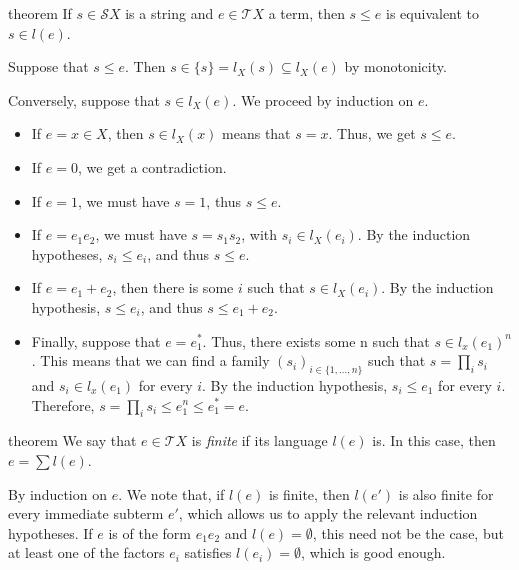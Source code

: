 \documentclass[11pt,a4paper]{amsart}
\theoremstyle{definition}
\begin{document}
\begin{theoremEnd}{theorem}
  \label{thm:membership-characterization}
  If $s \in \mathcal{S}X$ is a string and $e \in \mathcal{T}X$ a term, then
  $s \leq e$ is equivalent to $s \in l(e)$.
\end{theoremEnd}

\begin{proofEnd}
  Suppose that $s  \leq  e$.  Then $s  \in  \{s\} = l_X(s)  \subseteq  l_X(e)$ by monotonicity.

  Conversely, suppose that $s  \in  l_X(e)$. We proceed by induction on $e$.
  \begin{itemize}
  \item If $e = x  \in  X$, then $s  \in  l_X(x)$ means that $s = x$.  Thus, we get
    $s  \leq  e$.
  \item If $e = 0$, we get a contradiction.
  \item If $e = 1$, we must have $s = 1$, thus $s  \leq  e$.
  \item If $e = e_{1}e_{2}$, we must have $s = s_{1}s_{2}$, with $s_i  \in  l_X(e_i)$.  By the
    induction hypotheses, $s_i  \leq  e_i$, and thus $s  \leq  e$.
  \item If $e = e_{1} + e_{2}$, then there is some $i$ such that $s  \in  l_X(e_i)$.  By
    the induction hypothesis, $s  \leq  e_i$, and thus $s  \leq  e_{1} + e_{2}$.
  \item Finally, suppose that $e = e_{1}^*$.  Thus, there exists some n such that
    $s  \in  l_x(e_{1})^n$.  This means that we can find a family
    $(s_i)_{i  \in  \{1, \ldots ,n\}}$ such that $s =  \prod _i s_i$ and $s_i  \in  l_x(e_{1})$ for
    every $i$.  By the induction hypothesis, $s_i  \leq  e_{1}$ for every $i$.
    Therefore, $s =  \prod _i s_i  \leq  e_{1}^n  \leq  e_{1}^* = e$.
  \end{itemize}
\end{proofEnd}

\begin{theoremEnd}{theorem}
  \label{thm:finite-term}
  We say that $e  \in  \mathcal{T}X$ is \emph{finite} if its language $l(e)$ is. In
  this case, then $e =  \sum  l(e)$.
\end{theoremEnd}

\begin{proofEnd}
  By induction on $e$. We note that, if $l(e)$ is finite, then $l(e')$ is also
  finite for every immediate subterm $e'$, which allows us to apply the relevant
  induction hypotheses.  If $e$ is of the form $e_1e_2$ and $l(e) =  \emptyset $, this
  need not be the case, but at least one of the factors $e_i$ satisfies
  $l(e_i) =  \emptyset $, which is good enough.
\end{proofEnd}
\end{document}
